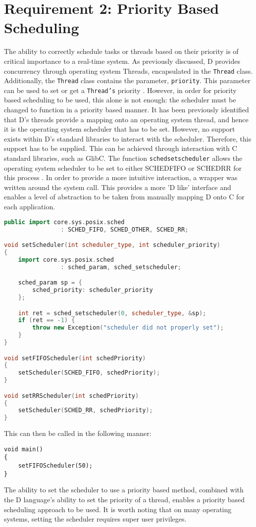 \section{Requirement 2: Priority Based Scheduling}
The ability to correctly schedule tasks or threads based on their priority is of 
critical importance to a real-time system. As previously discussed, D provides 
concurrency through operating system Threads, encapsulated in the
\texttt{Thread} class. Additionally, the \texttt{Thread} class contains the 
parameter, \texttt{priority}. This parameter can be used to set or get a
\texttt{Thread's} priority \cite{core-thread}. 
However, in order for priority based scheduling to be used, this alone is not 
enough: the scheduler must be changed to function in a priority based manner. 
It has been previously identified that D's threads provide a mapping onto an operating  
system thread, and hence it is the operating system scheduler that has to be set.  
However, no support exists within D's standard libraries to interact with the
scheduler. 
Therefore, this support has to be supplied. 
This can be achieved through interaction with C standard libraries, such as GlibC. 
The function \texttt{sched\textunderscore{}setscheduler} allows the operating system 
scheduler to be set to either SCHED\textunderscore{}FIFO or SCHED\textunderscore{}RR for 
this process \cite{sched-setscheduler}. 
In order to provide a more intuitive interaction, a wrapper was written around the 
system call. This provides a more 'D like' interface and enables a level of
abstraction to be taken from manually mapping D onto C for each application. 
\begin{lstlisting}[language=C++]
public import core.sys.posix.sched 
                : SCHED_FIFO, SCHED_OTHER, SCHED_RR; 

void setScheduler(int scheduler_type, int scheduler_priority)
{
    import core.sys.posix.sched 
                : sched_param, sched_setscheduler; 

    sched_param sp = { 
        sched_priority: scheduler_priority 
    }; 

    int ret = sched_setscheduler(0, scheduler_type, &sp); 
    if (ret == -1) {
        throw new Exception("scheduler did not properly set");
    }
}

void setFIFOScheduler(int schedPriority)
{
    setScheduler(SCHED_FIFO, schedPriority);
}

void setRRScheduler(int schedPriority)
{
    setScheduler(SCHED_RR, schedPriority); 
}
\end{lstlisting}
This can then be called in the following manner: 
\begin{lstlisting}
void main()
{
    setFIFOScheduler(50); 
}
\end{lstlisting}
The ability to set the scheduler to use a priority based method, combined with 
the D language's ability to set the priority of a thread, 
enables a priority based scheduling approach to be used. It is worth noting
that on many operating systems, setting the scheduler requires super user
privileges. 

